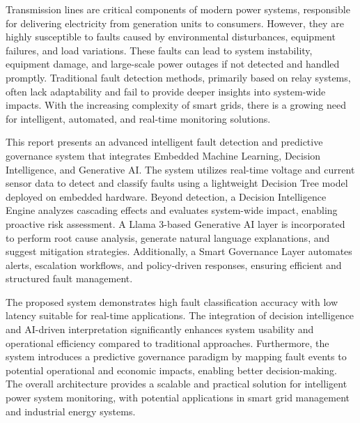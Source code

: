 \vspace{-1cm}

Transmission lines are critical components of modern power systems, responsible for delivering electricity from generation units to consumers. However, they are highly susceptible to faults caused by environmental disturbances, equipment failures, and load variations. These faults can lead to system instability, equipment damage, and large-scale power outages if not detected and handled promptly. Traditional fault detection methods, primarily based on relay systems, often lack adaptability and fail to provide deeper insights into system-wide impacts. With the increasing complexity of smart grids, there is a growing need for intelligent, automated, and real-time monitoring solutions.

This report presents an advanced intelligent fault detection and predictive governance system that integrates Embedded Machine Learning, Decision Intelligence, and Generative AI. The system utilizes real-time voltage and current sensor data to detect and classify faults using a lightweight Decision Tree model deployed on embedded hardware. Beyond detection, a Decision Intelligence Engine analyzes cascading effects and evaluates system-wide impact, enabling proactive risk assessment. A Llama 3-based Generative AI layer is incorporated to perform root cause analysis, generate natural language explanations, and suggest mitigation strategies. Additionally, a Smart Governance Layer automates alerts, escalation workflows, and policy-driven responses, ensuring efficient and structured fault management.

The proposed system demonstrates high fault classification accuracy with low latency suitable for real-time applications. The integration of decision intelligence and AI-driven interpretation significantly enhances system usability and operational efficiency compared to traditional approaches. Furthermore, the system introduces a predictive governance paradigm by mapping fault events to potential operational and economic impacts, enabling better decision-making. The overall architecture provides a scalable and practical solution for intelligent power system monitoring, with potential applications in smart grid management and industrial energy systems.

\pagebreak